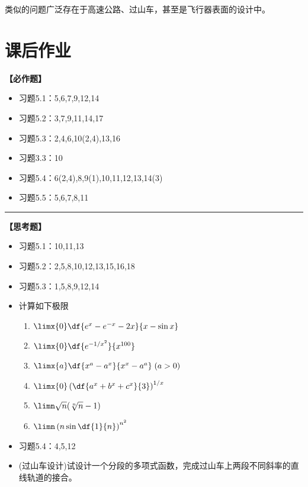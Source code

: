 类似的问题广泛存在于高速公路、过山车，甚至是飞行器表面的设计中。

\newpage

\section*{课后作业}

{\bf 【必作题】}

\begin{itemize}
  \item 习题5.1：5,6,7,9,12,14
  \item 习题5.2：3,7,9,11,14,17
  \item 习题5.3：2,4,6,10(2,4),13,16
  \item 习题3.3：10
  \item 习题5.4：6(2,4),8,9(1),10,11,12,13,14(3)
  \item 习题5.5：5,6,7,8,11
\end{itemize}

\bigskip

\hrule

\bigskip
\bigskip

{\bf 【思考题】}

\begin{itemize}
  \item 习题5.1：10,11,13
  \item 习题5.2：2,5,8,10,12,13,15,16,18
  \item 习题5.3：1,5,8,9,12,14
  \item 计算如下极限
  	\begin{enumerate}
	  \item $\limx{0}\df{e^x-e^{-x}-2x}{x-\sin x}$ 
	  \item $\limx{0}\df{e^{-1/x^2}}{x^{100}}$ 
	  \item $\limx{a}\df{x^a-a^x}{x^x-a^a}\;(a>0)$ 
	  \item $\limx{0}\left(\df{a^x+b^x+c^x}{3}\right)^{1/x}$ 
	  \item $\limn\sqrt{n}(\sqrt[n]{n}-1)$ 
	  \item $\limn\left(n\sin\df{1}{n}\right)^{n^2}$
	\end{enumerate}	
  \item 习题5.4：4,5,12
  \item (过山车设计)试设计一个分段的多项式函数，完成过山车上两段不同斜率的直线轨道的接合。
\end{itemize}

\newpage

